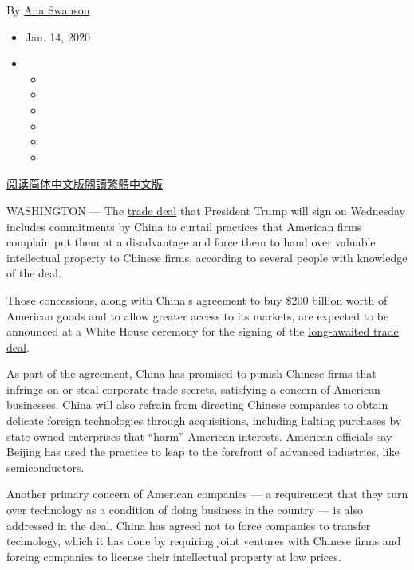 By \href{https://www.nytimes3xbfgragh.onion/by/ana-swanson}{Ana Swanson}

\begin{itemize}
\item
  Jan. 14, 2020
\item
  \begin{itemize}
  \item
  \item
  \item
  \item
  \item
  \item
  \end{itemize}
\end{itemize}

\href{https://cn.nytimes3xbfgragh.onion/business/20200115/trump-china-trade-deal/}{阅读简体中文版}\href{https://cn.nytimes3xbfgragh.onion/business/20200115/trump-china-trade-deal/zh-hant/}{閱讀繁體中文版}

WASHINGTON --- The
\href{https://www.nytimes3xbfgragh.onion/2019/12/12/business/economy/trump-china-trade-deal.html}{trade
deal} that President Trump will sign on Wednesday includes commitments
by China to curtail practices that American firms complain put them at a
disadvantage and force them to hand over valuable intellectual property
to Chinese firms, according to several people with knowledge of the
deal.

Those concessions, along with China's agreement to buy \$200 billion
worth of American goods and to allow greater access to its markets, are
expected to be announced at a White House ceremony for the signing of
the
\href{https://www.nytimes3xbfgragh.onion/2019/12/31/us/politics/trump-china-trade-dea.html}{long-awaited
trade deal}.

As part of the agreement, China has promised to punish Chinese firms
that
\href{https://www.nytimes3xbfgragh.onion/2018/06/22/technology/china-micron-chips-theft.html}{infringe
on or steal corporate trade secrets}, satisfying a concern of American
businesses. China will also refrain from directing Chinese companies to
obtain delicate foreign technologies through acquisitions, including
halting purchases by state-owned enterprises that ``harm'' American
interests. American officials say Beijing has used the practice to leap
to the forefront of advanced industries, like semiconductors.

Another primary concern of American companies --- a requirement that
they turn over technology as a condition of doing business in the
country --- is also addressed in the deal. China has agreed not to force
companies to transfer technology, which it has done by requiring joint
ventures with Chinese firms and forcing companies to license their
intellectual property at low prices.

